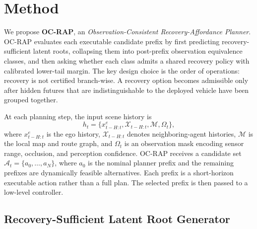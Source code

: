 \documentclass[conference]{IEEEtran}
\begin{document}

\section{Method}
\label{sec:method}

We propose \textbf{OC-RAP}, an \emph{Observation-Consistent Recovery-Affordance Planner}.  OC-RAP evaluates each executable candidate prefix by first predicting recovery-sufficient latent roots, collapsing them into post-prefix observation equivalence classes, and then asking whether each class admits a shared recovery policy with calibrated lower-tail margin.  The key design choice is the order of operations: recovery is not certified branch-wise.  A recovery option becomes admissible only after hidden futures that are indistinguishable to the deployed vehicle have been grouped together.

At each planning step, the input scene history is
\begin{equation}
    h_t = \{x^e_{t-H:t}, \mathcal{X}_{t-H:t}, \mathcal{M}, \Omega_t\},
\end{equation}
where $x^e_{t-H:t}$ is the ego history, $\mathcal{X}_{t-H:t}$ denotes neighboring-agent histories, $\mathcal{M}$ is the local map and route graph, and $\Omega_t$ is an observation mask encoding sensor range, occlusion, and perception confidence.  OC-RAP receives a candidate set $\mathcal{A}_t=\{a_0,\ldots,a_N\}$, where $a_0$ is the nominal planner prefix and the remaining prefixes are dynamically feasible alternatives.  Each prefix is a short-horizon executable action rather than a full plan.  The selected prefix is then passed to a low-level controller.


\subsection{Recovery-Sufficient Latent Root Generator}
\label{subsec:rsrg}
\end{document}
